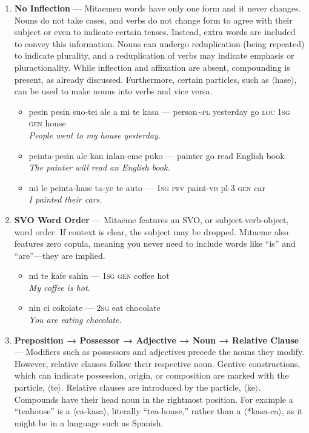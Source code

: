 \documentclass[a4paper, titlepage]{article}
\begin{document}
\begin{enumerate}
	\item \textbf{No Inflection} — Mitaemen words have only one form and it never changes. Nouns do not take cases, and verbs do not change form to agree with their subject or even to indicate certain tenses. Instead, extra words are included to convey this information. Nouns can undergo reduplication (being repeated) to indicate plurality, and a reduplication of verbs may indicate emphasis or pluractionality. While inflection and affixation are absent, compounding is present, as already discussed.  Furthermore, certain particles, such as $\langle$hase$\rangle$, can be used to make nouns into verbs and vice versa.
	\begin{itemize}
		\item pesin pesin suo-tei ale a mi te kasa — person\textasciitilde{}\textsc{pl} yesterday go \textsc{loc 1sg gen} house\\\textit{People went to my house yesterday.}
		\item peinta-pesin ale kan inlan-eme puko — painter go read English book\\\textit{The painter will read an English book.}
		\item mi le peinta-hase ta-ye te auto — \textsc{1sg pfv} paint-\textsc{vb} pl-3 \textsc{gen} car \\\textit{I painted their cars.}
	\end{itemize}
	\item \textbf{SVO Word Order} — Mitaeme features an SVO, or subject-verb-object, word order. If context is clear, the subject may be dropped. Mitaeme also features zero copula, meaning you never need to include words like ``is'' and ``are''—they are implied.
	\begin{itemize}
		\item mi te kafe sahin — \textsc{1sg} \textsc{gen} coffee hot\\\textit{My coffee is hot.}
		\item nin ci cokolate — \textsc{2sg} eat chocolate\\\textit{You are eating chocolate.}
	\end{itemize}
	\item \textbf{ Preposition → Possessor → Adjective → Noun → Relative Clause  } — Modifiers such as possessors and adjectives precede the nouns they modify. However, relative clauses follow their respective noun. Gentive constructions, which can indicate possession, origin, or composition are marked with the particle, $\langle$te$\rangle$. Relative clauses are introduced by the particle, $\langle$ke$\rangle$. Compounds have their head noun in the rightmost position. For example a ``teahouse'' is a $\langle$ca-kasa$\rangle$, literally ``tea-house,'' rather than a $\langle$*kasa-ca$\rangle$, as it might be in a language such as Spanish.

\end{enumerate}
\end{document}
